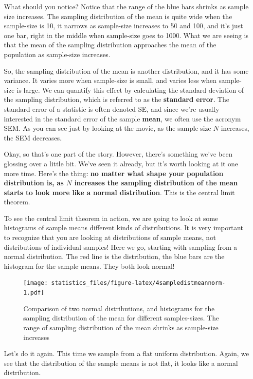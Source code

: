 \documentclass[]{book}
\begin{document}
What should you notice? Notice that the range of the blue bars shrinks as sample size increases. The sampling distribution of the mean is quite wide when the sample-size is 10, it narrows as sample-size increases to 50 and 100, and it's just one bar, right in the middle when sample-size goes to 1000. What we are seeing is that the mean of the sampling distribution approaches the mean of the population as sample-size increases.

So, the sampling distribution of the mean is another distribution, and it has some variance. It varies more when sample-size is small, and varies less when sample-size is large. We can quantify this effect by calculating the standard deviation of the sampling distribution, which is referred to as the \textbf{standard error}. The standard error of a statistic is often denoted SE, and since we're usually interested in the standard error of the sample \textbf{mean}, we often use the acronym SEM. As you can see just by looking at the movie, as the sample size \(N\) increases, the SEM decreases.

Okay, so that's one part of the story. However, there's something we've been glossing over a little bit. We've seen it already, but it's worth looking at it one more time. Here's the thing: \textbf{no matter what shape your population distribution is, as \(N\) increases the sampling distribution of the mean starts to look more like a normal distribution}. This is the central limit theorem.

To see the central limit theorem in action, we are going to look at some histograms of sample means different kinds of distributions. It is very important to recognize that you are looking at distributions of sample means, not distributions of individual samples! Here we go, starting with sampling from a normal distribution. The red line is the distribution, the blue bars are the histogram for the sample means. They both look normal!

\begin{figure}
\centering
\texttt{[image: statistics\_files/figure-latex/4sampledistmeannorm-1.pdf]}
\caption{\label{fig:4sampledistmeannorm}Comparison of two normal distributions, and histograms for the sampling distribution of the mean for different samples-sizes. The range of sampling distribution of the mean shrinks as sample-size increases}
\end{figure}

Let's do it again. This time we sample from a flat uniform distribution. Again, we see that the distribution of the sample means is not flat, it looks like a normal distribution.
\end{document}
